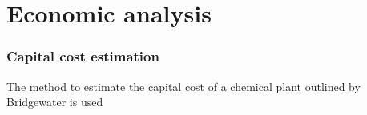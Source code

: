 
\section{Economic analysis}
\label{app:economics}
\subsubsection{Capital cost estimation}

The method to estimate the capital cost of a chemical plant outlined by Bridgewater is used 